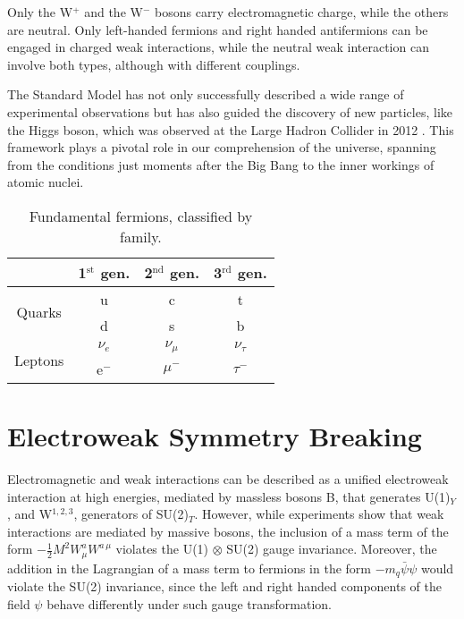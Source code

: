 Only the W$^+$ and the W$^-$ bosons carry electromagnetic charge, while the others are neutral.
Only left-handed fermions and right handed antifermions can be engaged in charged weak interactions, while the neutral weak interaction can involve both types, although with different couplings.

The Standard Model has not only successfully described a wide range of experimental observations but has also guided the discovery of new particles, like the Higgs boson, which was observed at the Large Hadron Collider in 2012 \cite{ATLASHiggsDiscovery, CMSHiggsDiscovery}.
This framework plays a pivotal role in our comprehension of the universe, spanning from the conditions just moments after the Big Bang to the inner workings of atomic nuclei.

\begin{table}[tbh]
	\centering
	\caption{Fundamental fermions, classified by family.}
	\label{tab:fermions}
	\begin{tabular}{ c c c c }
		\hline
		 & 1$^{\text{st}}$ gen. & 2$^{\text{nd}}$ gen. & 3$^{\text{rd}}$ gen. \\%
		\hline
		\multirow{2}{*}{Quarks}  & u       & c         & t          \\%
		                         & d       & s         & b          \\%
		\hline
		\multirow{2}{*}{Leptons} & $\nu_e$ & $\nu_\mu$ & $\nu_\tau$ \\%
		                         & e$^-$   & $\mu$$^-$ & $\tau$$^-$ \\%
		\hline
	\end{tabular}
\end{table}

\section{Electroweak Symmetry Breaking}
\label{EWSB}
Electromagnetic and weak interactions can be described as a unified electroweak interaction at high energies, mediated by massless bosons B, that generates U(1)$_Y$, and W$^{1, 2, 3}$, generators of SU(2)$_T$.
However, while experiments show that weak interactions are mediated by massive bosons, the inclusion of a mass term of the form $-\frac{1}{2} M^2 W^a_\mu W^{a\, \mu}$ violates the U(1) $\otimes$ SU(2) gauge invariance.
Moreover, the addition in the Lagrangian of a mass term to fermions in the form $-m_q \bar\psi \psi$ would violate the SU(2) invariance, since the left and right handed components of the field $\psi$ behave differently under such gauge transformation.

